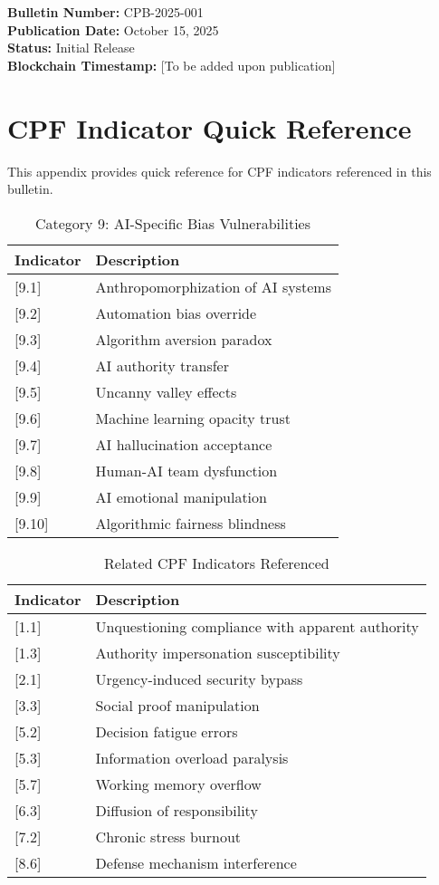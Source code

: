 \documentclass[11pt,a4paper]{article}
\begin{document}
\textbf{Bulletin Number:} CPB-2025-001\\
\textbf{Publication Date:} October 15, 2025\\
\textbf{Status:} Initial Release\\
\textbf{Blockchain Timestamp:} [To be added upon publication]

\appendix

\section{CPF Indicator Quick Reference}
\label{app:indicators}

This appendix provides quick reference for CPF indicators referenced in this bulletin.

\begin{table}[H]
\centering
\caption{Category 9: AI-Specific Bias Vulnerabilities}
\begin{tabular}{lp{10cm}}
\toprule
\textbf{Indicator} & \textbf{Description} \\
\midrule
{[}9.1{]} & Anthropomorphization of AI systems \\
{[}9.2{]} & Automation bias override \\
{[}9.3{]} & Algorithm aversion paradox \\
{[}9.4{]} & AI authority transfer \\
{[}9.5{]} & Uncanny valley effects \\
{[}9.6{]} & Machine learning opacity trust \\
{[}9.7{]} & AI hallucination acceptance \\
{[}9.8{]} & Human-AI team dysfunction \\
{[}9.9{]} & AI emotional manipulation \\
{[}9.10{]} & Algorithmic fairness blindness \\
\bottomrule
\end{tabular}
\end{table}

\begin{table}[H]
\centering
\caption{Related CPF Indicators Referenced}
\begin{tabular}{lp{10cm}}
\toprule
\textbf{Indicator} & \textbf{Description} \\
\midrule
{[}1.1{]} & Unquestioning compliance with apparent authority \\
{[}1.3{]} & Authority impersonation susceptibility \\
{[}2.1{]} & Urgency-induced security bypass \\
{[}3.3{]} & Social proof manipulation \\
{[}5.2{]} & Decision fatigue errors \\
{[}5.3{]} & Information overload paralysis \\
{[}5.7{]} & Working memory overflow \\
{[}6.3{]} & Diffusion of responsibility \\
{[}7.2{]} & Chronic stress burnout \\
{[}8.6{]} & Defense mechanism interference \\
\bottomrule
\end{tabular}
\end{table}
\end{document}
